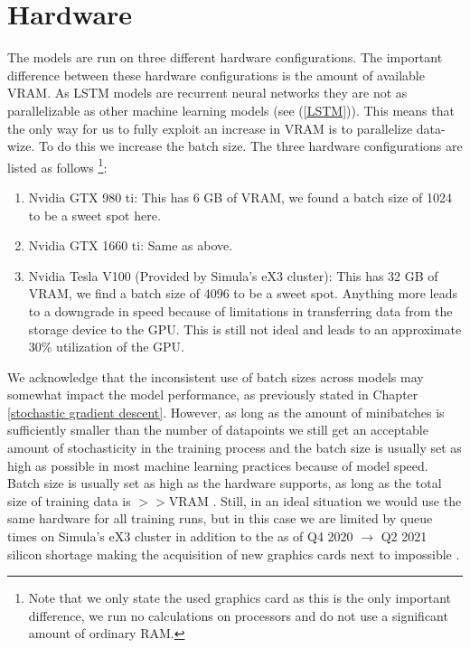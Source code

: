 \section{Hardware}
The models are run on three different hardware configurations. The important difference 
between these hardware configurations is the amount of available VRAM. As LSTM models 
are recurrent neural networks they are not as parallelizable as other machine learning 
models (see (\ref{LSTM})). This means that the only way for us to fully exploit 
an increase in VRAM is to parallelize data-wize. To do this we increase the batch size.
The three hardware configurations are listed as follows \footnote{Note that we only 
state the used graphics card as this is the only important difference, we run no 
calculations on processors and do not use a significant amount of ordinary RAM.}:
\begin{enumerate}
    \item Nvidia GTX 980 ti: This has 6 GB of VRAM, we found a batch size of 1024 
        to be a sweet spot here.
    \item Nvidia GTX 1660 ti: Same as above.
    \item Nvidia Tesla V100 (Provided by Simula's eX3 cluster): This has 32 GB of VRAM, we find a batch size of 4096 
        to be a sweet spot. Anything more leads to a downgrade in speed because 
        of limitations in transferring data from the storage device to the GPU. 
        This is still not ideal and leads to an approximate 30\% utilization of the 
        GPU.
\end{enumerate}
We acknowledge that the inconsistent use of batch sizes across models may somewhat 
impact the model performance, as previously stated in Chapter \ref{stochastic gradient descent}.
However, as long as the amount of minibatches is sufficiently smaller than the number of datapoints we 
still get an acceptable amount of stochasticity in the training process and the batch 
size is usually set as high as possible in most machine learning practices because 
of model speed. Batch size is usually set as high as the hardware supports, as long 
as the total size of training data is $>>$VRAM \citationneeded.
Still, in an ideal situation we would use the same hardware for all training runs, 
but in this case we are limited by queue times on Simula's eX3 cluster in addition 
to the as of Q4 2020 $\rightarrow$ Q2 2021 silicon shortage making the acquisition of 
new graphics cards next to impossible \cite{GPUShortage}.
